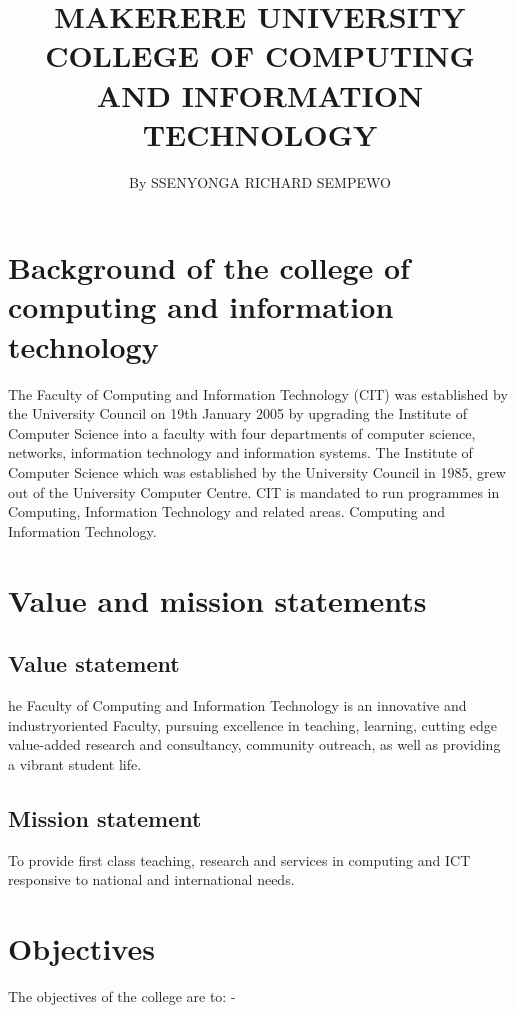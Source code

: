 \documentclass[a4paper,12pt]{article}
\begin{document}
\title{MAKERERE UNIVERSITY COLLEGE OF COMPUTING  AND INFORMATION TECHNOLOGY}
\author{By  SSENYONGA RICHARD SEMPEWO}

\maketitle
\section{Background of the college of computing and information technology}

The Faculty of Computing and Information Technology (CIT) was established by the University
Council on 19th January 2005 by upgrading the Institute of Computer Science into a faculty with
four departments of computer science, networks, information technology and information systems.
The Institute of Computer Science which was established by the University Council in 1985, grew out
of the University Computer Centre. CIT is mandated to run programmes in Computing, Information
Technology and related areas. Computing and Information Technology.

\section{Value and mission statements}

\subsection{Value statement}

he Faculty of Computing and Information Technology is an innovative and industryoriented
Faculty, pursuing excellence in teaching, learning, cutting edge value-added research and
consultancy, community outreach, as well as providing a vibrant student life.

\subsection{Mission statement}

To provide first class teaching, research and services in computing and ICT responsive
to national and international needs.

\section{Objectives}

The objectives of the college are to: -
\end{document}
